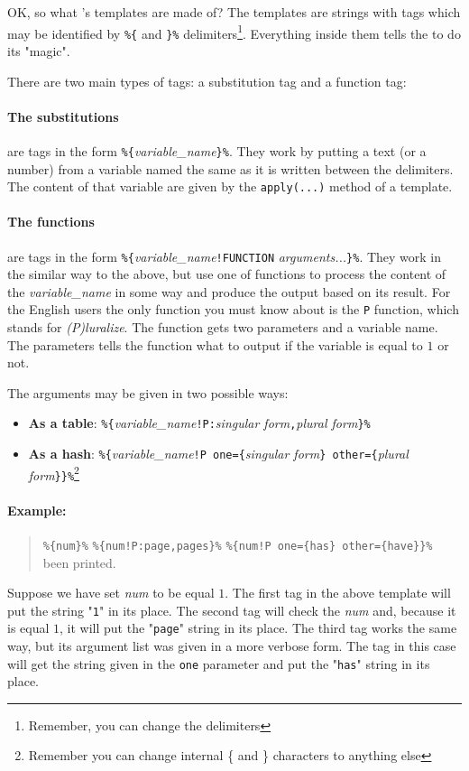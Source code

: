 OK, so what \mulan{}'s templates are made of? 
The templates are strings with tags which may be identified by \verb+%{+ and \verb+}%+ delimiters\footnote{Remember, you can change the delimiters}.
Everything inside them tells the \mulan{} to do its "magic". 

There are two main types of tags: a substitution tag and a function tag:
\paragraph{The substitutions} are tags in the form \verb+%{+\textit{variable\_name}\verb+}%+. They work by putting a text (or a number) from a variable named the same as it is written between the delimiters.
The content of that variable are given by the \verb+apply(...)+ method of a template. 

\paragraph{The functions} are tags in the form \verb+%{+\textit{variable\_name}\verb+!FUNCTION+ \textit{arguments...}\verb+}%+.
They work in the similar way to the above, but use one of \mulan{} functions to process the content of the \textit{variable\_name} in some way and produce the output based on its result.
For the English users the only function you must know about is the \texttt{P} function, which stands for \textit{(P)luralize}.
The function gets two parameters and a variable name. The parameters tells the function what to output if the variable is equal to $1$ or not.

The arguments may be given in two possible ways:
\begin{itemize}
	\item \textbf{As a table}: \verb+%{+\textit{variable\_name}\verb+!P:+\textit{singular form}\verb+,+\textit{plural form}\verb+}%+
	\item \textbf{As a hash}: \verb+%{+\textit{variable\_name}\verb+!P one={+\textit{singular form}\verb+} other={+\textit{plural form}\verb+}}%+\footnote{Remember you can change internal \{
	and \} characters to anything else}
\end{itemize}

\paragraph{Example:}
\begin{quote}
	\verb+%{num}%+ \verb+%{num!P:page,pages}%+ \verb+%{num!P one={has} other={have}}%+ been printed.
\end{quote}
Suppose we have set \textit{num} to be equal $1$. The first tag in the above template will put the string "\texttt{1}" in its place.
The second tag will check the \textit{num} and, because it is equal $1$, it will put the "\texttt{page}" string in its place.
The third tag works the same way, but its argument list was given in a more verbose form. The tag in this case will get the string given in the \texttt{one} parameter
and put the "\texttt{has}" string in its place.

